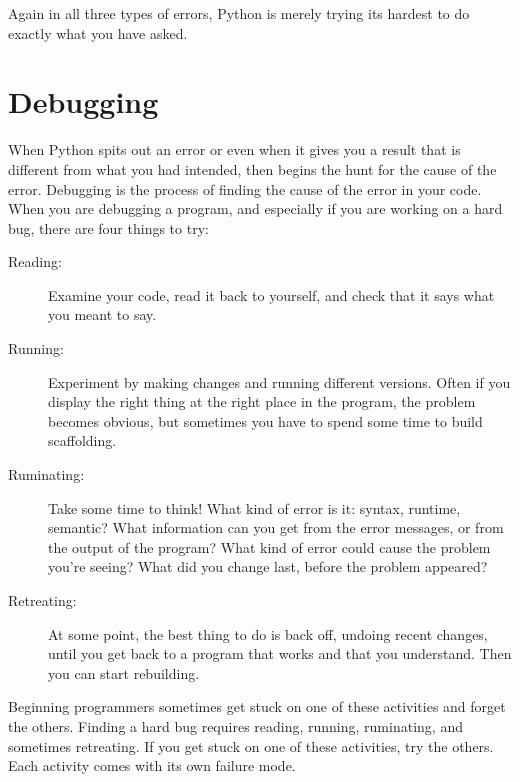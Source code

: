 Again in all three types of errors, Python is merely trying its hardest to 
do exactly what you have asked.

\section{Debugging}
When Python spits out an error or even when it gives you a result that is different from what you had intended, then begins the hunt for the cause of the error. Debugging is the process of finding the cause of the error in your code. When you are debugging a program, and especially if you are working on a hard bug, there are four things to try:

\begin{description}

\item[Reading:] Examine your code, read it back to yourself, and check that it says what you meant to say.

\item[Running:] Experiment by making changes and running different versions. Often if you display the right thing at the right place in the program, the problem becomes obvious, but sometimes you have to spend some time to build scaffolding.

\item[Ruminating:] Take some time to think! What kind of error is it: syntax, runtime, semantic? What information can you get from the error messages, or from the output of the program? What kind of error could cause the problem you're seeing? What did you change last, before the problem appeared?

\item[Retreating:] At some point, the best thing to do is back off, undoing recent changes, until you get back to a program that works and that you understand. Then you can start rebuilding.

\end{description}

Beginning programmers sometimes get stuck on one of these activities and forget the others.  Finding a hard bug requires reading, running, ruminating, and sometimes retreating. If you get stuck on one of these activities, try the others. Each activity comes with its own failure mode.


